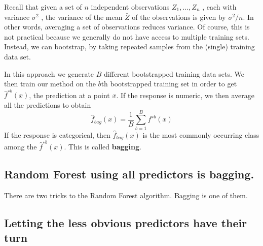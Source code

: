 \documentclass[
]{article}
\newenvironment{Shaded}{\begin{snugshade}}{\end{snugshade}}
\newcommand{\AttributeTok}[1]{\textcolor[rgb]{0.77,0.63,0.00}{#1}}
\newcommand{\ConstantTok}[1]{\textcolor[rgb]{0.00,0.00,0.00}{#1}}
\newcommand{\DecValTok}[1]{\textcolor[rgb]{0.00,0.00,0.81}{#1}}
\newcommand{\FunctionTok}[1]{\textcolor[rgb]{0.00,0.00,0.00}{#1}}
\newcommand{\NormalTok}[1]{#1}
\newcommand{\OtherTok}[1]{\textcolor[rgb]{0.56,0.35,0.01}{#1}}
\newcommand{\SpecialCharTok}[1]{\textcolor[rgb]{0.00,0.00,0.00}{#1}}
\begin{document}
Recall that given a set of \(n\) independent observations
\(Z_1 , \ldots , Z_n\) , each with variance \(\sigma^2\) , the variance
of the mean \(\bar{Z}\) of the observations is given by \(\sigma^2/n\).
In other words, averaging a set of observations reduces variance. Of
course, this is not practical because we generally do not have access to
multiple training sets. Instead, we can bootstrap, by taking repeated
samples from the (single) training data set.

In this approach we generate \(B\) different bootstrapped training data
sets. We then train our method on the \(b\)th bootstrapped training set
in order to get \(\hat f^{∗b}(x)\), the prediction at a point \(x\). If
the response is numeric, we then average all the predictions to obtain
\[
\hat  f_{bag}(x) = \frac{1}{B}\sum_{b=1}^B f^{∗b}(x)
\] If the response is categorical, then \(\hat f_{bag}(x)\) is the most
commonly occurring class among the \(\hat f^{∗b}(x)\). This is called
\textbf{bagging}.

\hypertarget{random-forest-using-all-predictors-is-bagging.}{%
\subsection{Random Forest using all predictors is
bagging.}\label{random-forest-using-all-predictors-is-bagging.}}

There are two tricks to the Random Forest algorithm. Bagging is one of
them.

\begin{Shaded}
\end{Shaded}

\hypertarget{letting-the-less-obvious-predictors-have-their-turn}{%
\subsection{Letting the less obvious predictors have their
turn}\label{letting-the-less-obvious-predictors-have-their-turn}}
\end{document}

